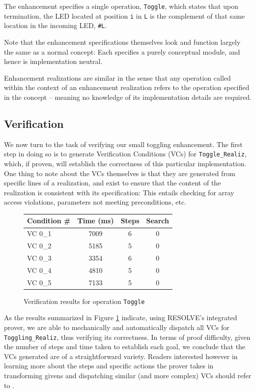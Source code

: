 The enhancement specifies a single operation, \texttt{Toggle}, which states that upon termination, the LED located at position \texttt{i} in \texttt{L} is the complement of that same location in the incoming LED, \texttt{\#L}.

Note that the enhancement specifications themselves look and function largely the same as a normal concept: Each specifies a purely conceptual module, and hence is implementation neutral. 

Enhancement realizations are similar in the sense that any operation called within the context of an enhancement realization refers to the operation specified in the concept -- meaning no knowledge of its implementation details are required.

\subsection{Verification}

We now turn to the task of verifying our small toggling enhancement. The first step in doing so is to generate Verification Conditions (VCs) for \texttt{Toggle\_Realiz}, which, if proven, will establish the correctness of this particular implementation. One thing to note about the VCs themselves is that they are generated from specific lines of a realization, and exist to ensure that the content of the realization is consistent with its specification: This entails checking for array access violations, parameters not meeting preconditions, etc.  

\begin{figure}[!htb]
\centering
\begin{tabular}{lccc}
	\toprule
	Condition \# & Time (ms)	& Steps	& Search \\
	\midrule
	VC 0\_1	& 7009	& 6	& 0	\\
	VC 0\_2	& 5185	& 5	& 0	\\
	VC 0\_3	& 3354	& 6	& 0	\\
	VC 0\_4	& 4810	& 5	& 0	\\
	VC 0\_5	& 7133	& 5	& 0	\\
	\bottomrule
\end{tabular}
\caption{Verification results for operation \texttt{Toggle}}
\label{fig:results}
\end{figure}

As the results summarized in Figure \ref{fig:results} indicate, using RESOLVE's integrated prover, we are able to mechanically and automatically dispatch all VCs for \texttt{Toggling\_Realiz}, thus verifying its correctness. In terms of proof difficulty, given the number of steps and time taken to establish each goal, we conclude that the VCs generated are of a straightforward variety. Readers interested however in learning more about the steps and specific actions the prover takes in transforming givens and dispatching similar (and more complex) VCs should refer to \cite{smith:2013}.

